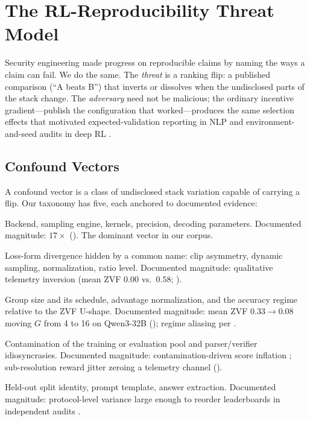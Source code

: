 \section{The RL-Reproducibility Threat Model}
\label{sec:p5-threat}
Security engineering made progress on reproducible claims by naming the ways a
claim can fail. We do the same. The \emph{threat} is a ranking flip: a
published comparison (``A beats B'') that inverts or dissolves when the
undisclosed parts of the stack change. The \emph{adversary} need not be
malicious; the ordinary incentive gradient---publish the configuration that
worked---produces the same selection effects that motivated expected-validation
reporting in NLP \citep{dodge2019show} and environment-and-seed audits in deep
RL \citep{henderson2018deep}.

\subsection{Confound Vectors}
\label{sec:p5-vectors}
A confound vector is a class of undisclosed stack variation capable of
carrying a flip. Our taxonomy has five, each anchored to documented evidence:
\begin{description}[leftmargin=1.5em, itemsep=2pt, topsep=2pt]
\item[V1 --- Numerics and serving.] Backend, sampling engine, kernels,
precision, decoding parameters. Documented magnitude: $17\times$
(). The dominant vector in our corpus.
\item[V2 --- Objective semantics under a shared label.] Loss-form divergence
hidden by a common name: clip asymmetry, dynamic sampling, normalization,
ratio level. Documented magnitude: qualitative telemetry inversion (mean ZVF
$0.00$ vs.\ $0.58$; ).
\item[V3 --- Signal geometry.] Group size and its schedule, advantage
normalization, and the accuracy regime relative to the ZVF U-shape.
Documented magnitude: mean ZVF $0.33 \to 0.08$ moving $G$ from 4 to 16 on
Qwen3-32B (); regime aliasing per
.
\item[V4 --- Environment and data.] Contamination of the training or
evaluation pool and parser/verifier idiosyncrasies. Documented magnitude:
contamination-driven score inflation \citep{zhang2024gsm1k,
riddell2024contamination}; sub-resolution reward jitter zeroing a telemetry
channel ().
\item[V5 --- Evaluation protocol.] Held-out split identity, prompt template,
answer extraction. Documented magnitude: protocol-level variance large enough
to reorder leaderboards in independent audits \citep{biderman2024lessons,
hochlehnert2025sober, zhang2024benchvariance}.
\end{description}

